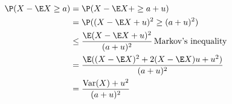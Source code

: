 
\begin{align*}
    \P(X - \E X \geq a) &= \P( X - \E X + \geq a+ u)\\
			&= \P( (X- \E X + u)^2 \geq (a+u)^2)\\
			&\leq \frac{\E (X - \E X + u)^2}{(a+u)^2} \, \mbox{Markov's inequality} \\
			&= \frac{\E( (X - \E X)^2 + 2(X - \E X)u + u^2)}{(a+u)^2} \\
			&= \frac{\mathrm{Var}(X) + u^2}{(a+u)^2} 
\end{align*}
